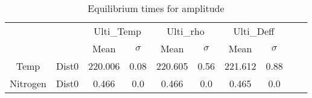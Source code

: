 \begin{table}[h]
\centering
\caption{Equilibrium times for amplitude}
\label{table:5}
\begin{tabular}{cccccccccc}
\toprule
 &  & \multicolumn{2}{c}{Ulti_Temp} & \multicolumn{2}{c}{Ulti_rho} & \multicolumn{2}{c}{Ulti_Deff} \\
 &  & Mean & $\sigma$ & Mean & $\sigma$ & Mean & $\sigma$ \\
\midrule
Temp & Dist0 & 220.006 & 0.08 & 220.605 & 0.56 & 221.612 & 0.88 \\
Nitrogen & Dist0 & 0.466 & 0.0 & 0.466 & 0.0 & 0.465 & 0.0 \\
\bottomrule
\end{tabular}
\end{table}
